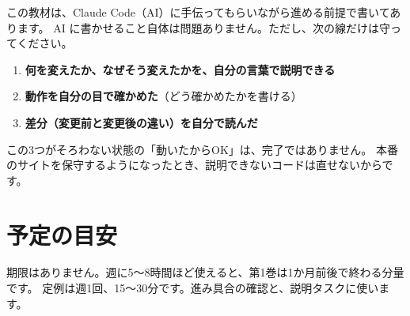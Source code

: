 この教材は、Claude Code（AI）に手伝ってもらいながら進める前提で書いてあります。
AI に書かせること自体は問題ありません。ただし、次の線だけは守ってください。

\begin{caution}[完了と言ってよい条件]
\begin{enumerate}
  \item \textbf{何を変えたか、なぜそう変えたかを、自分の言葉で説明できる}
  \item \textbf{動作を自分の目で確かめた}（どう確かめたかを書ける）
  \item \textbf{差分（変更前と変更後の違い）を自分で読んだ}
\end{enumerate}
この3つがそろわない状態の「動いたからOK」は、完了ではありません。
本番のサイトを保守するようになったとき、説明できないコードは直せないからです。
\end{caution}

\section{予定の目安}

期限はありません。週に5〜8時間ほど使えると、第1巻は1か月前後で終わる分量です。
定例は週1回、15〜30分です。進み具合の確認と、説明タスクに使います。
